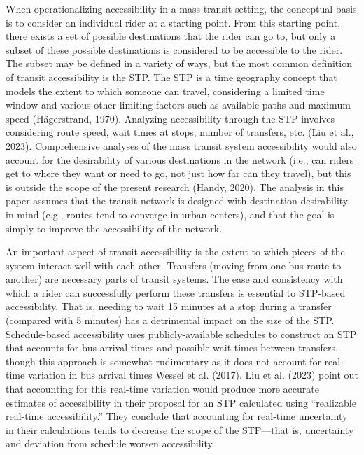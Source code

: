 \documentclass[
  12pt,
]{article}
\begin{document}
When operationalizing accessibility in a mass transit setting, the
conceptual basis is to consider an individual rider at a starting point.
From this starting point, there exists a set of possible destinations
that the rider can go to, but only a subset of these possible
destinations is considered to be accessible to the rider. The subset may
be defined in a variety of ways, but the most common definition of
transit accessibility is the STP. The STP is a time geography concept
that models the extent to which someone can travel, considering a
limited time window and various other limiting factors such as available
paths and maximum speed (Hägerstrand, 1970). Analyzing accessibility
through the STP involves considering route speed, wait times at stops,
number of transfers, etc. (Liu et al., 2023). Comprehensive analyses of
the mass transit system accessibility would also account for the
desirability of various destinations in the network (i.e., can riders
get to where they want or need to go, not just how far can they travel),
but this is outside the scope of the present research (Handy, 2020). The
analysis in this paper assumes that the transit network is designed with
destination desirability in mind (e.g., routes tend to converge in urban
centers), and that the goal is simply to improve the accessibility of
the network.

An important aspect of transit accessibility is the extent to which
pieces of the system interact well with each other. Transfers (moving
from one bus route to another) are necessary parts of transit systems.
The ease and consistency with which a rider can successfully perform
these transfers is essential to STP-based accessibility. That is,
needing to wait 15 minutes at a stop during a transfer (compared with 5
minutes) has a detrimental impact on the size of the STP. Schedule-based
accessibility uses publicly-available schedules to construct an STP that
accounts for bus arrival times and possible wait times between
transfers, though this approach is somewhat rudimentary as it does not
account for real-time variation in bus arrival times Wessel et al.
(2017). Liu et al. (2023) point out that accounting for this real-time
variation would produce more accurate estimates of accessibility in
their proposal for an STP calculated using ``realizable real-time
accessibility.'' They conclude that accounting for real-time uncertainty
in their calculations tends to decrease the scope of the STP---that is,
uncertainty and deviation from schedule worsen accessibility.
\end{document}

